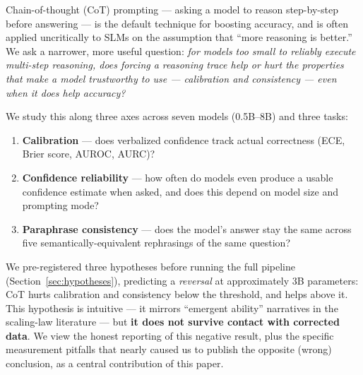 \documentclass{article}
\begin{document}
Chain-of-thought (CoT) prompting --- asking a model to reason step-by-step before answering --- is the default technique for boosting accuracy, and is often applied uncritically to SLMs on the assumption that ``more reasoning is better.'' We ask a narrower, more useful question: \emph{for models too small to reliably execute multi-step reasoning, does forcing a reasoning trace help or hurt the properties that make a model trustworthy to use --- calibration and consistency --- even when it does help accuracy?}

We study this along three axes across seven models (0.5B--8B) and three tasks:

\begin{enumerate}
    \item \textbf{Calibration} --- does verbalized confidence track actual correctness (ECE, Brier score, AUROC, AURC)?
    \item \textbf{Confidence reliability} --- how often do models even produce a usable confidence estimate when asked, and does this depend on model size and prompting mode?
    \item \textbf{Paraphrase consistency} --- does the model's answer stay the same across five semantically-equivalent rephrasings of the same question?
\end{enumerate}

We pre-registered three hypotheses before running the full pipeline (Section~\ref{sec:hypotheses}), predicting a \emph{reversal} at approximately 3B parameters: CoT hurts calibration and consistency below the threshold, and helps above it. This hypothesis is intuitive --- it mirrors ``emergent ability'' narratives in the scaling-law literature --- but \textbf{it does not survive contact with corrected data}. We view the honest reporting of this negative result, plus the specific measurement pitfalls that nearly caused us to publish the opposite (wrong) conclusion, as a central contribution of this paper.
\end{document}
